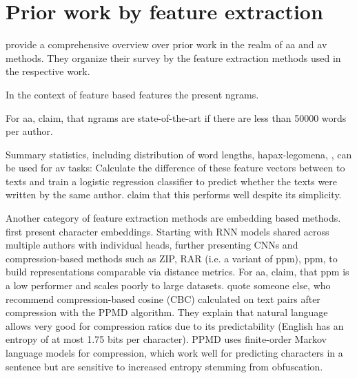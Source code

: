 \section{Prior work by feature extraction}
\label{sec:prior_work_by_feat_extraction}

\citet{tyo_state_2022} provide a comprehensive overview over prior work in the realm of \ac{aa} and \ac{av} methods.
They organize their survey by the feature extraction methods used in the respective work.

In the context of feature based features the present ngrams.

For \ac{aa}, \citet{tyo_state_2022} claim, that ngrams are state-of-the-art if there are less than 50000 words per author.

Summary statistics, including distribution of word lengths, hapax-legomena, , 
can be used for \ac{av} tasks: 
Calculate the difference of these feature vectors between to texts and train a logistic regression classifier 
to predict whether the texts were written by the same author.
\citet{tyo_state_2022} claim that this performs well despite its simplicity.


Another category of feature extraction methods are embedding based methods.
\citet{tyo_state_2022} first present character embeddings.
Starting with RNN models shared across multiple authors with individual heads, 
further presenting CNNs and %
compression-based methods such as ZIP, RAR (i.e. a variant of \ac{ppm}), \ac{ppm}, 
to build representations comparable via distance metrics.
For \ac{aa}, \citet{tyo_state_2022} claim, that \ac{ppm} is a low performer and scales poorly to large datasets.
\citet{bevendorff_divergence_based_2020} quote someone else, who recommend compression-based cosine (CBC) calculated on text pairs after compression with the PPMD algorithm.
They explain that natural language allows very good for compression ratios due to its predictability (English has an entropy of at most 1.75 bits per character).
PPMD uses finite-order Markov language models for compression, which work well for predicting characters in a sentence but are sensitive to increased entropy stemming from obfuscation.

